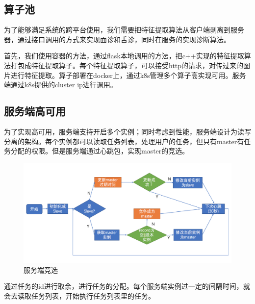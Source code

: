 \subsection{算子池}

为了能够满足系统的跨平台使用，我们需要把特征提取算法从客户端剥离到服务器，通过接口调用的方式来实现面诊和舌诊，同时在服务的实现诊断算法。

首先，我们使用容器的方法，通过flask本地调用的方法，把c++实现的特征提取算法打包成特征提取算子。每个特征提取算子，可以接受http的请求，对传过来的图片进行特征提取。算子部署在docker上，通过k8s管理多个算子高实现可用。服务端通过k8s提供的cluster ip进行调用。

\subsection{服务端高可用}
为了实现高可用，服务端支持开启多个实例；同时考虑到性能，服务端设计为读写分离的架构。每个实例都可以读取任务列表，处理用户的任务，但只有master有任务分配的权限。但是服务端通过心跳包，实现master的竞选。
\begin{figure}
    \centering
    \includegraphics[width=12cm]{images/slave-master.png}
    \caption{服务端竞选}
    \label{fig:my_label}
\end{figure}
通过任务的id进行取余，进行任务的分配。每个服务端实例过一定的间隔时间，就会去读取任务列表，开始执行任务列表里的任务。

